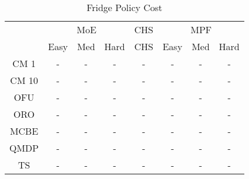 \begin{table}[]
\centering
\begin{tabular}{|c|c|c|c|c|c|c|c|}
\hline
& \multicolumn{3}{c|}{MoE} & CHS & \multicolumn{3}{c|}{MPF} 
 \\ 
 & Easy & Med & Hard & CHS & Easy & Med & Hard\\\hline
CM 1 & - & - & - & - & - & - & -\\
\hline
CM 10 & - & - & - & - & - & - & -\\
\hline
OFU & - & - & - & - & - & - & -\\
\hline
ORO & - & - & - & - & - & - & -\\
\hline
MCBE & - & - & - & - & - & - & -\\
\hline
QMDP & - & - & - & - & - & - & -\\
\hline
TS & - & - & - & - & - & - & -\\
\hline
\end{tabular}
\caption{Fridge Policy Cost}
\label{tab:experiment_Fridge_cost}
\end{table}
